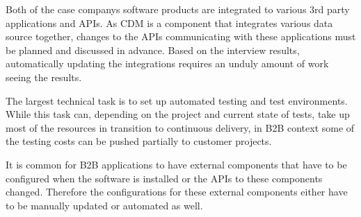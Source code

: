 \documentclass[english]{tktltiki2}
\theoremstyle{definition}
\theoremstyle{remark}
\begin{document}
Both of the case companys software products are integrated to various 3rd party applications and APIs. As CDM is a component that integrates various data source together, changes to the APIs communicating with these applications must be planned and discussed in advance. Based on the interview results, automatically updating the integrations requires an unduly amount of work seeing the results. 

The largest technical task is to set up automated testing and test environments. While this task can, depending on the project and current state of tests, take up most of the resources in transition to continuous delivery, in B2B context some of the testing costs can be pushed partially to customer projects.  





It is common for B2B applications to have external components that have to be configured when the software is installed or the APIs to these components changed. Therefore the configurations for these external components either have to be manually updated or automated as well.
\end{document}
